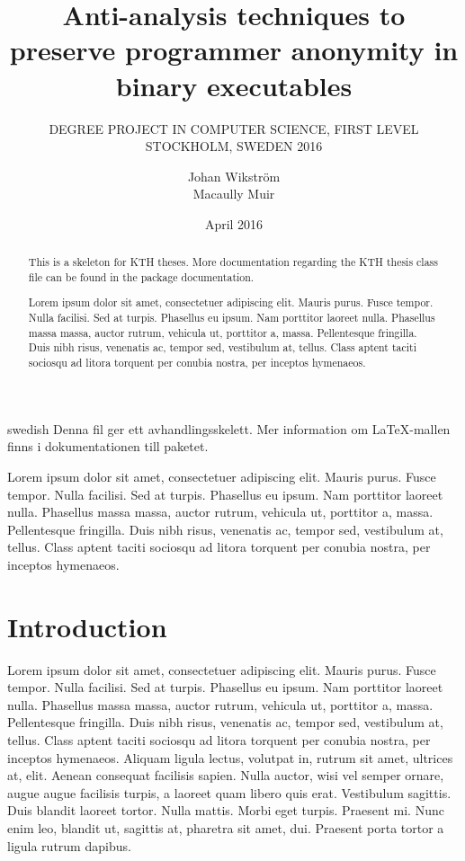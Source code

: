 \documentclass[a4paper,11pt]{kth-mag}
\title{Anti-analysis techniques to preserve programmer anonymity in binary
executables}
\subtitle{
    DEGREE PROJECT IN COMPUTER SCIENCE, FIRST LEVEL \\
    STOCKHOLM, SWEDEN 2016
}
\author{Johan Wikström \\ Macaully Muir}
\date{April 2016}
\begin{document}
\frontmatter
\pagestyle{empty}
\removepagenumbers
\maketitle
{}
\begin{abstract}
  This is a skeleton for KTH theses. More documentation
  regarding the KTH thesis class file can be found in
  the package documentation.

Lorem ipsum dolor sit amet, consectetuer adipiscing elit. Mauris
purus. Fusce tempor. Nulla facilisi. Sed at turpis. Phasellus eu
ipsum. Nam porttitor laoreet nulla. Phasellus massa massa, auctor
rutrum, vehicula ut, porttitor a, massa. Pellentesque fringilla. Duis
nibh risus, venenatis ac, tempor sed, vestibulum at, tellus. Class
aptent taciti sociosqu ad litora torquent per conubia nostra, per
inceptos hymenaeos.
\end{abstract}
\clearpage
\begin{foreignabstract}{swedish}
  Denna fil ger ett avhandlingsskelett.
  Mer information om \LaTeX-mallen finns i
  dokumentationen till paketet.

Lorem ipsum dolor sit amet, consectetuer adipiscing elit. Mauris
purus. Fusce tempor. Nulla facilisi. Sed at turpis. Phasellus eu
ipsum. Nam porttitor laoreet nulla. Phasellus massa massa, auctor
rutrum, vehicula ut, porttitor a, massa. Pellentesque fringilla. Duis
nibh risus, venenatis ac, tempor sed, vestibulum at, tellus. Class
aptent taciti sociosqu ad litora torquent per conubia nostra, per
inceptos hymenaeos.
\end{foreignabstract}
\clearpage
\tableofcontents*
\mainmatter
\pagestyle{newchap}
\chapter{Introduction}

Lorem ipsum dolor sit amet, consectetuer adipiscing elit. Mauris
purus. Fusce tempor. Nulla facilisi. Sed at turpis. Phasellus eu
ipsum. Nam porttitor laoreet nulla. Phasellus massa massa, auctor
rutrum, vehicula ut, porttitor a, massa. Pellentesque fringilla. Duis
nibh risus, venenatis ac, tempor sed, vestibulum at, tellus. Class
aptent taciti sociosqu ad litora torquent per conubia nostra, per
inceptos hymenaeos. Aliquam ligula lectus, volutpat in, rutrum sit
amet, ultrices at, elit. Aenean consequat facilisis sapien. Nulla
auctor, wisi vel semper ornare, augue augue facilisis turpis, a
laoreet quam libero quis erat. Vestibulum sagittis. Duis blandit
laoreet tortor. Nulla mattis. Morbi eget turpis. Praesent mi. Nunc
enim leo, blandit ut, sagittis at, pharetra sit amet, dui. Praesent
porta tortor a ligula rutrum dapibus.
\end{document}

